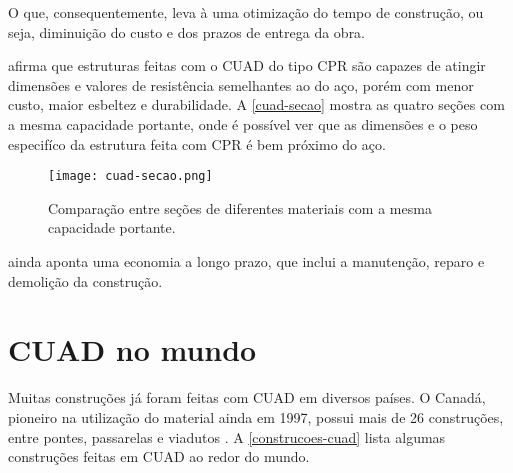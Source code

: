 O que, consequentemente, leva à uma otimização do tempo de construção, ou seja, diminuição do custo e dos prazos de entrega da obra.

 afirma que estruturas feitas com o CUAD do tipo CPR são capazes de atingir dimensões e valores de resistência semelhantes ao do aço, porém com menor custo, maior esbeltez e durabilidade. A \autoref{cuad-secao} mostra as quatro seções com a mesma capacidade portante, onde é possível ver que as dimensões e o peso especifíco da estrutura feita com CPR é bem próximo do aço.

\begin{figure}[htb]
	\caption{\label{cuad-secao}Comparação entre seções de diferentes materiais com a mesma capacidade portante.}
	\begin{center}
	    \texttt{[image: cuad-secao.png]}
	\end{center}
\end{figure}

 ainda aponta uma economia a longo prazo, que inclui a manutenção, reparo e demolição da construção.

\section{CUAD no mundo}

Muitas construções já foram feitas com CUAD em diversos países. O Canadá, pioneiro na utilização do material ainda em 1997, possui mais de 26 construções, entre pontes, passarelas e viadutos \cite{Russel_e_Graybeal}. A \autoref{construcoes-cuad} lista algumas construções feitas em CUAD ao redor do mundo.

